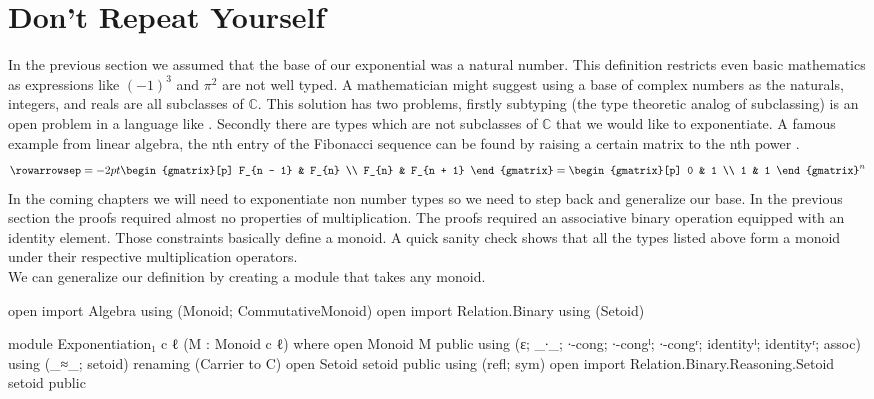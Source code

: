 \documentclass[./Thesis.tex]{subfiles}
\begin{document}
\section{Don't Repeat Yourself}
\label{sec:dont-repeat-yourself}
In the previous section we assumed that the base of our exponential was a
natural number. This definition restricts even basic mathematics as expressions
like $(-1)^3$ and $\pi^2$ are not well typed. A mathematician might suggest
using a base of complex numbers as the naturals, integers, and reals are all
subclasses of $\mathbb{C}$. This solution has two problems, firstly subtyping
(the type theoretic analog of subclassing) is an open problem in a language like
\Agda{} \cite{algebraic-subtyping}. Secondly there are types which are not
subclasses of $\mathbb{C}$ that we would like to exponentiate. A famous example
from linear algebra, the nth entry of the Fibonacci sequence can be found by
raising a certain matrix to the nth power \cite{linear-algebra}.
\begin{align}
  \label{eqn:fib-example}
  \rowarrowsep=-2pt
  \begin{gmatrix}[p]
    F_{n - 1} & F_{n} \\
    F_{n} & F_{n + 1}
  \end{gmatrix}
  =
  {
  \begin{gmatrix}[p]
    0 & 1 \\
    1 & 1
  \end{gmatrix}
  }^n
\end{align}
In the coming chapters we will need to exponentiate non number types so we need
to step back and generalize our base. In the previous section the proofs
required almost no properties of multiplication. The proofs required an
associative binary operation equipped with an identity element. Those
constraints basically define a monoid. A quick sanity check shows that all the
types listed above form a monoid under their respective multiplication
operators. \\
We can generalize our definition by creating a module that takes any monoid.
\begin{code}[hide]
  open import Algebra using (Monoid; CommutativeMonoid)
  open import Relation.Binary using (Setoid)
\end{code}
\begin{code}
  module Exponentiation₁ {c ℓ} (M : Monoid c ℓ) where
    open Monoid M public
      using (ε; _∙_; ∙-cong; ∙-congˡ; ∙-congʳ; identityˡ; identityʳ; assoc)
      using (_≈_; setoid)
      renaming (Carrier to C)
    open Setoid setoid public using (refl; sym)
    open import Relation.Binary.Reasoning.Setoid setoid public
\end{code}
\end{document}
